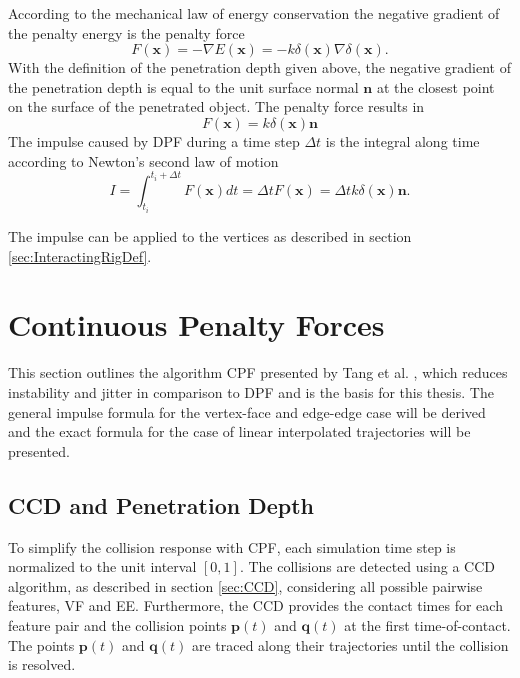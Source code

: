 According to the mechanical law of energy conservation \cite{WEBER2012} %
 the  negative gradient of the penalty energy is the penalty force
\begin{equation}
      F(\mathbf{x}) = - \nabla  E(\mathbf{x})= - k \delta (\mathbf{x}) \nabla\delta (\mathbf{x}).
\end{equation}
With the definition of the penetration depth given above, the negative gradient of the penetration depth is equal to the unit surface normal $\mathbf{n}$ at the closest point on the surface of the penetrated object. The penalty force results in 
\begin{equation}
      F(\mathbf{x}) = k \delta (\mathbf{x}) \mathbf{n} 
            \label{eq:discrete_penalty_force}
\end{equation}
The impulse caused by DPF during a time step $\Delta t$ is the integral along time according to Newton's second law of motion
\begin{equation}
      I = \int_{t_i}^{t_i+\Delta t} F(\mathbf{x})dt=\Delta t F(\mathbf{x})=\Delta t k \delta (\mathbf{x}) \mathbf{n}. 
\end{equation}

The impulse can be applied to the vertices as described in section \ref{sec:InteractingRigDef}.

\section{Continuous Penalty Forces}
\label{sec:ContinuousPenaltyForces}
This section outlines the algorithm CPF presented by Tang et al. \cite{TANG2012}, which reduces instability and jitter in comparison to DPF and is the basis for this thesis. The general impulse formula for the vertex-face and edge-edge case will be derived and the exact formula for the case of linear interpolated trajectories will be presented.

\subsection{CCD and Penetration Depth}
\label{sec:CCDandPenetrationDepth}
To simplify the collision response with CPF, each simulation time step is normalized to the unit interval $[0, 1]$. The collisions are detected using a CCD algorithm, as described in section \ref{sec:CCD}, considering all possible pairwise features, VF and EE. Furthermore, the CCD provides the contact times for each feature pair and the collision points $\mathbf p(t)$ and $\mathbf q(t)$ at the first time-of-contact. The points $\mathbf p(t)$ and $\mathbf q(t)$ are traced along their trajectories until the collision is resolved.

